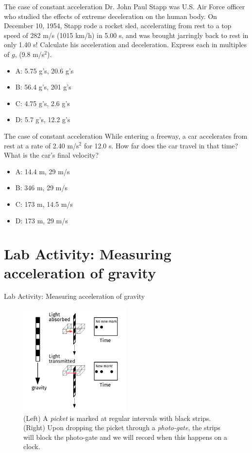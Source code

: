 \documentclass{beamer}
\begin{document}
\begin{frame}{The case of constant acceleration}
Dr. John Paul Stapp was U.S. Air Force officer who studied the effects of extreme deceleration on the human body.  On December 10, 1954, Stapp rode a rocket sled, accelerating from rest to a top speed of 282 m/s (1015 km/h) in 5.00 s, and was brought jarringly back to rest in only 1.40 s!  Calculate his acceleration and deceleration. Express each in multiples of $g$, (9.8 m/s$^2$).
\begin{itemize}
\item A: 5.75 g's, 20.6 g's
\item B: 56.4 g's, 201 g's
\item C: 4.75 g's, 2.6 g's
\item D: 5.7 g's, 12.2 g's
\end{itemize}
\end{frame}

\begin{frame}{The case of constant acceleration}
While entering a freeway, a car accelerates from rest at a rate of 2.40 m/s$^2$ for 12.0 s.  How far does the car travel in that time?  What is the car’s final velocity?
\begin{itemize}
\item A: 14.4 m, 29 m/s
\item B: 346 m, 29 m/s
\item C: 173 m, 14.5 m/s
\item D: 173 m, 29 m/s
\end{itemize}
\end{frame}

\section{Lab Activity: Measuring acceleration of gravity}

\begin{frame}{Lab Activity: Measuring acceleration of gravity}
\small
\begin{figure}
\centering
\includegraphics[width=0.5\textwidth]{figures/PicketG.pdf}
\caption{\label{fig:picket} (Left) A \textit{picket} is marked at regular intervals with black strips.  (Right) Upon dropping the picket through a \textit{photo-gate}, the strips will block the photo-gate and we will record when this happens on a clock.}
\end{figure}
\end{frame}
\end{document}
